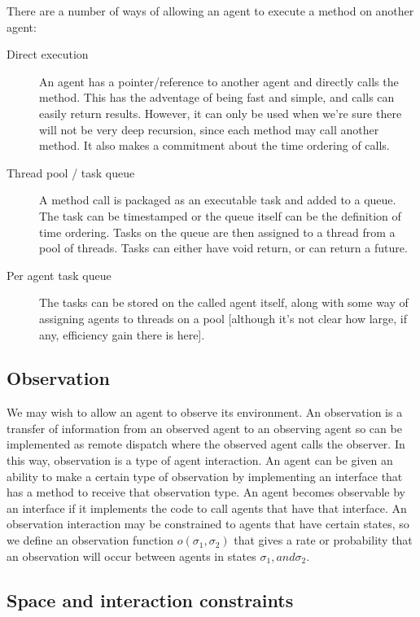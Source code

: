\documentclass[a4paper]{article}
\begin{document}
There are a number of ways of allowing an agent to execute a method on another agent:
\begin{description}

\item[Direct execution] An agent has a pointer/reference to another agent and directly calls the method. This has the adventage of being fast and simple, and calls can easily return results. However, it can only be used when we're sure there will not be very deep recursion, since each method may call another method. It also makes a commitment about the time ordering of calls.

\item[Thread pool / task queue] A method call is packaged as an executable task and added to a queue. The task can be timestamped or the queue itself can be the definition of time ordering. Tasks on the queue are then assigned to a thread from a pool of threads. Tasks can either have void return, or can return a future. 

\item[Per agent task queue] The tasks can be stored on the called agent itself, along with some way of assigning agents to threads on a pool [although it's not clear how large, if any, efficiency gain there is here].

\end{description}

\subsection{Observation}

We may wish to allow an agent to observe its environment. An observation is a transfer of information from an observed agent to an observing agent so can be implemented as remote dispatch where the observed agent calls the observer. In this way, observation is a type of agent interaction. An agent can be given an ability to make a certain type of observation by implementing an interface that has a method to receive that observation type. An agent becomes observable by an interface if it implements the code to call agents that have that interface. An observation interaction may be constrained to agents that have certain states, so we define an observation function $o(\sigma_1, \sigma_2)$ that gives a rate or probability that an observation will occur between agents in states $\sigma_1, and \sigma_2$.

\subsection{Space and interaction constraints}
\end{document}
